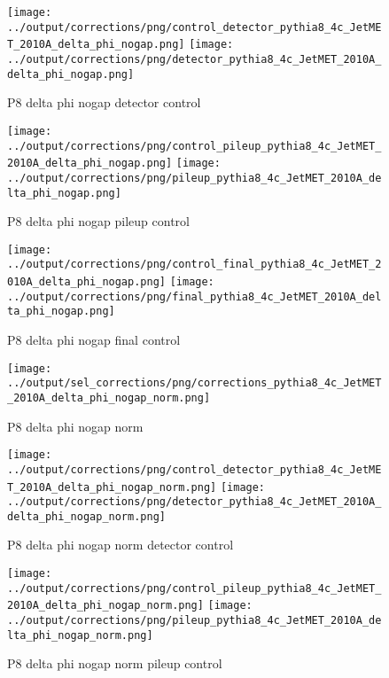 \documentclass[11pt]{book}
\begin{document}
\begin{figure}[ht]
\centering
\texttt{[image: ../output/corrections/png/control\_detector\_pythia8\_4c\_JetMET\_2010A\_delta\_phi\_nogap.png]}
\texttt{[image: ../output/corrections/png/detector\_pythia8\_4c\_JetMET\_2010A\_delta\_phi\_nogap.png]}
\caption{P8 delta phi nogap detector control}
\label{fig:p8_JetMET_2010A_delta_phi_nogap_detector_control}
\end{figure}

\begin{figure}[ht]
\centering
\texttt{[image: ../output/corrections/png/control\_pileup\_pythia8\_4c\_JetMET\_2010A\_delta\_phi\_nogap.png]}
\texttt{[image: ../output/corrections/png/pileup\_pythia8\_4c\_JetMET\_2010A\_delta\_phi\_nogap.png]}
\caption{P8 delta phi nogap pileup control}
\label{fig:p8_JetMET_2010A_delta_phi_nogap_pileup_control}
\end{figure}


\begin{figure}[ht]
\centering
\texttt{[image: ../output/corrections/png/control\_final\_pythia8\_4c\_JetMET\_2010A\_delta\_phi\_nogap.png]}
\texttt{[image: ../output/corrections/png/final\_pythia8\_4c\_JetMET\_2010A\_delta\_phi\_nogap.png]}
\caption{P8 delta phi nogap final control}
\label{fig:p8_JetMET_2010A_delta_phi_nogap_final_control}
\end{figure}


\begin{figure}[ht]
\centering
\texttt{[image: ../output/sel\_corrections/png/corrections\_pythia8\_4c\_JetMET\_2010A\_delta\_phi\_nogap\_norm.png]}
\caption{P8 delta phi nogap norm}
\label{fig:p8_JetMET_2010A_delta_phi_nogap_norm}
\end{figure}

\begin{figure}[ht]
\centering
\texttt{[image: ../output/corrections/png/control\_detector\_pythia8\_4c\_JetMET\_2010A\_delta\_phi\_nogap\_norm.png]}
\texttt{[image: ../output/corrections/png/detector\_pythia8\_4c\_JetMET\_2010A\_delta\_phi\_nogap\_norm.png]}
\caption{P8 delta phi nogap norm detector control}
\label{fig:p8_JetMET_2010A_delta_phi_nogap_norm_detector_control}
\end{figure}

\begin{figure}[ht]
\centering
\texttt{[image: ../output/corrections/png/control\_pileup\_pythia8\_4c\_JetMET\_2010A\_delta\_phi\_nogap\_norm.png]}
\texttt{[image: ../output/corrections/png/pileup\_pythia8\_4c\_JetMET\_2010A\_delta\_phi\_nogap\_norm.png]}
\caption{P8 delta phi nogap norm pileup control}
\label{fig:p8_JetMET_2010A_delta_phi_nogap_norm_pileup_control}
\end{figure}
\end{document}
